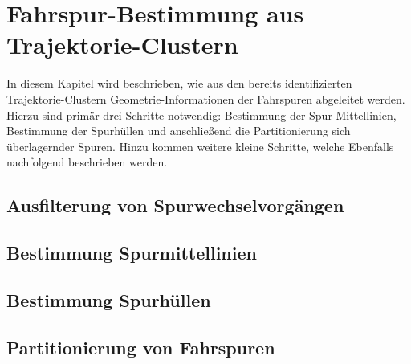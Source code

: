 
\chapter{Fahrspur-Bestimmung aus Trajektorie-Clustern}
\label{cha:lane_definition}

In diesem Kapitel wird beschrieben, wie aus den bereits identifizierten Trajektorie-Clustern
Geometrie-Informationen der Fahrspuren abgeleitet werden. Hierzu sind primär drei Schritte notwendig:
Bestimmung der Spur-Mittellinien, Bestimmung der Spurhüllen und anschließend die Partitionierung sich überlagernder
Spuren. Hinzu kommen weitere kleine Schritte, welche Ebenfalls nachfolgend beschrieben werden.

\section{Ausfilterung von Spurwechselvorgängen}
\label{sec:real2_filter_lane_change}


\section{Bestimmung Spurmittellinien}
\label{sec:real2_define_lane_centerline}


\section{Bestimmung Spurhüllen}
\label{sec:real2_define_lane_envelope}


\section{Partitionierung von Fahrspuren}
\label{sec:real2_lane_partitioning}

